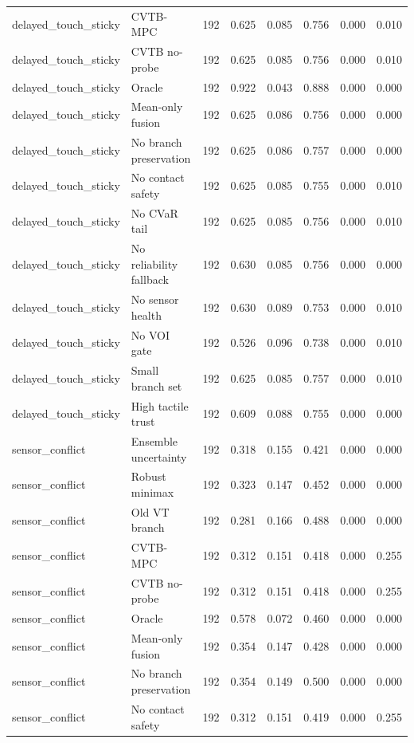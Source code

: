 \begin{table}[t]
\begin{tabular}{llrrrrrr}
delayed\_touch\_sticky & CVTB-MPC & 192 & 0.625 & 0.085 & 0.756 & 0.000 & 0.010 \\
delayed\_touch\_sticky & CVTB no-probe & 192 & 0.625 & 0.085 & 0.756 & 0.000 & 0.010 \\
delayed\_touch\_sticky & Oracle & 192 & 0.922 & 0.043 & 0.888 & 0.000 & 0.000 \\
delayed\_touch\_sticky & Mean-only fusion & 192 & 0.625 & 0.086 & 0.756 & 0.000 & 0.000 \\
delayed\_touch\_sticky & No branch preservation & 192 & 0.625 & 0.086 & 0.757 & 0.000 & 0.000 \\
delayed\_touch\_sticky & No contact safety & 192 & 0.625 & 0.085 & 0.755 & 0.000 & 0.010 \\
delayed\_touch\_sticky & No CVaR tail & 192 & 0.625 & 0.085 & 0.756 & 0.000 & 0.010 \\
delayed\_touch\_sticky & No reliability fallback & 192 & 0.630 & 0.085 & 0.756 & 0.000 & 0.000 \\
delayed\_touch\_sticky & No sensor health & 192 & 0.630 & 0.089 & 0.753 & 0.000 & 0.010 \\
delayed\_touch\_sticky & No VOI gate & 192 & 0.526 & 0.096 & 0.738 & 0.000 & 0.010 \\
delayed\_touch\_sticky & Small branch set & 192 & 0.625 & 0.085 & 0.757 & 0.000 & 0.010 \\
delayed\_touch\_sticky & High tactile trust & 192 & 0.609 & 0.088 & 0.755 & 0.000 & 0.000 \\
sensor\_conflict & Ensemble uncertainty & 192 & 0.318 & 0.155 & 0.421 & 0.000 & 0.000 \\
sensor\_conflict & Robust minimax & 192 & 0.323 & 0.147 & 0.452 & 0.000 & 0.000 \\
sensor\_conflict & Old VT branch & 192 & 0.281 & 0.166 & 0.488 & 0.000 & 0.000 \\
sensor\_conflict & CVTB-MPC & 192 & 0.312 & 0.151 & 0.418 & 0.000 & 0.255 \\
sensor\_conflict & CVTB no-probe & 192 & 0.312 & 0.151 & 0.418 & 0.000 & 0.255 \\
sensor\_conflict & Oracle & 192 & 0.578 & 0.072 & 0.460 & 0.000 & 0.000 \\
sensor\_conflict & Mean-only fusion & 192 & 0.354 & 0.147 & 0.428 & 0.000 & 0.000 \\
sensor\_conflict & No branch preservation & 192 & 0.354 & 0.149 & 0.500 & 0.000 & 0.000 \\
sensor\_conflict & No contact safety & 192 & 0.312 & 0.151 & 0.419 & 0.000 & 0.255 \\

\end{tabular}
\end{table}
